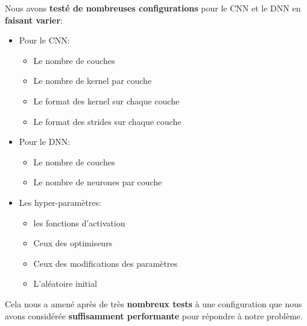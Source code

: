 \documentclass[12pt,a4paper]{extarticle}
\begin{document}
Nous avons \textbf{testé de nombreuses configurations} pour le CNN et le DNN en \textbf{faisant varier}:
\begin{itemize}
\item Pour le CNN:
	\begin{itemize}
	\item Le nombre de couches 
	\item Le nombre de kernel par couche
	\item Le format des kernel sur chaque couche
	\item Le format des strides sur chaque couche

	\end{itemize}
\item Pour le DNN:
	\begin{itemize}
	\item Le nombre de couches
	\item Le nombre de neurones par couche
	\end{itemize}
\item Les hyper-paramètres:
	\begin{itemize}
	\item les fonctions d'activation
	\item Ceux des optimiseurs
	\item Ceux des modifications des paramètres
	\item L'aléatoire initial
	\end{itemize}
\end{itemize}

Cela nous a amené après de très \textbf{nombreux tests} à une configuration que nous avons considérée \textbf{suffisamment performante} pour répondre à notre problème.
\end{document}
